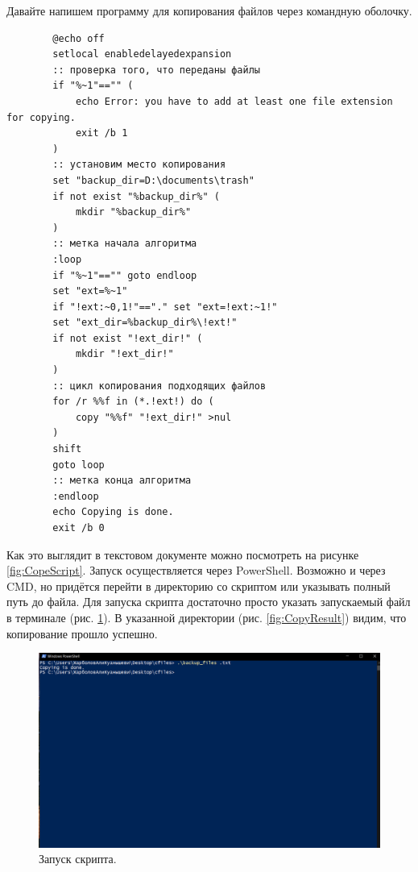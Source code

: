 Давайте напишем программу для копирования файлов через командную оболочку.

\begin{verbatim}
        @echo off
        setlocal enabledelayedexpansion
        :: проверка того, что переданы файлы
        if "%~1"=="" (
            echo Error: you have to add at least one file extension for copying.
            exit /b 1
        )
        :: установим место копирования
        set "backup_dir=D:\documents\trash"
        if not exist "%backup_dir%" (
            mkdir "%backup_dir%"
        )
        :: метка начала алгоритма
        :loop
        if "%~1"=="" goto endloop
        set "ext=%~1"
        if "!ext:~0,1!"=="." set "ext=!ext:~1!"
        set "ext_dir=%backup_dir%\!ext!"
        if not exist "!ext_dir!" (
            mkdir "!ext_dir!"
        )
        :: цикл копирования подходящих файлов
        for /r %%f in (*.!ext!) do (
            copy "%%f" "!ext_dir!" >nul
        )
        shift
        goto loop
        :: метка конца алгоритма
        :endloop
        echo Copying is done.
        exit /b 0

\end{verbatim}

Как это выглядит в текстовом документе можно посмотреть на рисунке \ref{fig:CopeScript}. Запуск осуществляется через PowerShell. Возможно и через CMD, но придётся перейти в директорию со скриптом или указывать полный путь до файла. Для запуска скрипта достаточно просто указать запускаемый файл в терминале (рис. \ref{fig:RunCopy}). В указанной директории (рис. \ref{fig:CopyResult}) видим, что копирование прошло успешно.

\begin{figure}[h!]
    \centering
    \includegraphics[width=0.5\linewidth]{Pic/lab1/photo_2025-05-21_08-15-49.jpg}
    \caption{Запуск скрипта.}
    \label{fig:RunCopy}
\end{figure}

